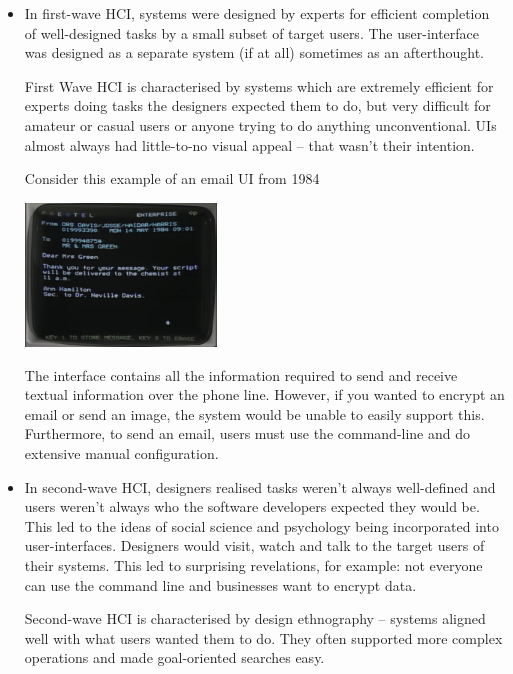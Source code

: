 \documentclass[10pt,\jkfside,a4paper]{article}
\begin{document}
\begin{itemize}

\item In first-wave HCI, systems were designed by experts for efficient
completion of well-designed tasks by a small subset of target users. The 
user-interface was designed as a separate system (if at all) sometimes as an 
afterthought.

First Wave HCI is characterised by systems which are extremely efficient for
experts doing tasks the designers expected them to do, but very difficult
for amateur or casual users or anyone trying to do anything unconventional.
UIs almost always had little-to-no visual appeal -- that wasn't their 
intention.

Consider this example of an email UI from 1984

\begin{center}
\includegraphics[width=0.4\textwidth]{1984email}
\end{center}

The interface contains all the information required to send and receive
textual information over the phone line. However, if you wanted to encrypt 
an email or send an image, the system would be unable to easily support this. 
Furthermore, to send an email, users must use the command-line and do 
extensive manual configuration.

\item In second-wave HCI, designers realised tasks weren't always 
well-defined and users weren't always who the software developers expected
they would be. This led to the ideas of social science and psychology being
incorporated into user-interfaces. Designers would visit, watch and talk
to the target users of their systems. This led to surprising revelations,
for example: not everyone can use the command line and businesses want to
encrypt data.

Second-wave HCI is characterised by design ethnography -- systems aligned
well with what users wanted them to do. They often supported more complex
operations and made goal-oriented searches easy.


\end{itemize}
\end{document}
